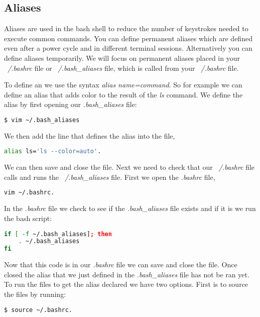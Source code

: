 \subsection{Aliases}
	
Aliases are used in the bash shell to reduce the number of keystrokes needed to execute common commands. You can define permanent aliases which are defined even after a power cycle and in different terminal sessions. Alternatively you can define aliases temporarily. We will focus on permanent aliases placed in your \emph{~/.bashrc} file or \emph{~/.bash\_aliases} file, which is called from your \emph{~/.bashrc} file. 

To define an  we use the syntax \emph{alias name=command}. So for example we can define an alias that adds color to the result of the \emph{ls} command. We define the alias by first opening our \emph{.bash\_aliases} file:

\begin{lstlisting}[language=bash]
	$ vim ~/.bash_aliases
\end{lstlisting}

We then add the line that defines the alias into the file,

\begin{lstlisting}[language=bash]
alias ls='ls --color=auto'.
\end{lstlisting}

We can then save and close the file. Next we need to check that our \emph{~/.bashrc} file calls and runs the \emph{~/.bash\_aliases} file. First we open the \emph{.bashrc} file,

\begin{lstlisting}[language=bash]
vim ~/.bashrc.
\end{lstlisting}

In the \emph{.bashrc} file we check to see if the \emph{.bash\_aliases} file exists and if it is we run the bash script:

\begin{lstlisting}[language=bash]
if [ -f ~/.bash_aliases]; then
	. ~/.bash_aliases
fi
\end{lstlisting}

Now that this code is in our \emph{.bashrc} file we can save and close the file. Once closed the alias that we just defined in the \emph{.bash\_aliases} file has not be ran yet. To run the files to get the alias declared we have two options. First is to source the files by running:

\begin{lstlisting}[language=bash]
	$ source ~/.bashrc.
\end{lstlisting}

